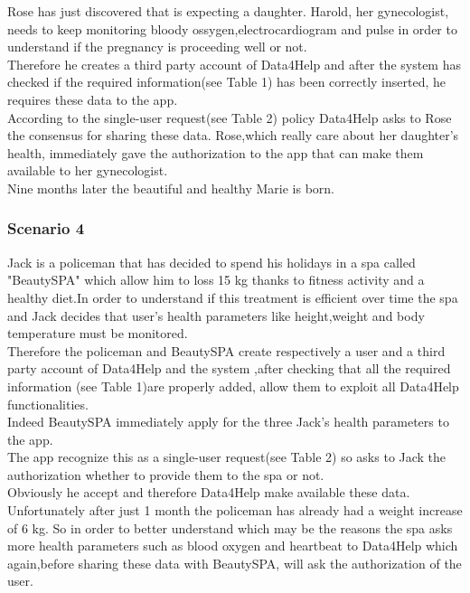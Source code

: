     Rose has just discovered that is expecting a daughter. Harold, her gynecologist, needs to keep monitoring bloody ossygen,electrocardiogram and pulse in order to understand if the pregnancy is proceeding well or not. \\Therefore he creates a third party account of Data4Help and after the system has checked if the required information(see Table 1) has been correctly inserted, he requires these data to the app. \\According to the single-user request(see Table 2)  policy Data4Help asks to Rose the consensus for sharing these data. Rose,which really care about her daughter's health, immediately gave the authorization to the app that can make them available to her gynecologist.\\ Nine months later the beautiful and healthy Marie is born.

    \subsubsection{Scenario 4}

    Jack is a policeman that has decided to spend his holidays in a spa called "BeautySPA" which allow him to loss 15 kg thanks to fitness activity and a healthy diet.In order to understand if this treatment is efficient over time the spa and Jack decides that user's health parameters like height,weight and body temperature must be monitored. \\Therefore the policeman and BeautySPA create respectively a user and a third party account of Data4Help and the system ,after checking that all the required information (see Table 1)are properly added, allow them to exploit all Data4Help functionalities.\\ Indeed  BeautySPA immediately apply for the three Jack's health parameters to the app. \\The app recognize this as a single-user request(see Table 2)  so asks to Jack the authorization whether to provide them to the spa or not. \\Obviously he accept and therefore Data4Help make available these data. \\Unfortunately after just 1 month the policeman has already had a weight increase of 6 kg. So in order to better understand which may be the reasons the spa asks more health parameters such as blood oxygen and heartbeat to Data4Help which again,before sharing these data with BeautySPA, will ask the authorization of the user.

